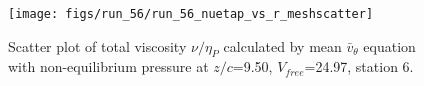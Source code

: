 \begin{figure}[H]
\centering
\texttt{[image: figs/run\_56/run\_56\_nuetap\_vs\_r\_meshscatter]}
\caption{Scatter plot of total viscosity $\nu / \eta_P$ calculated by mean $\bar{v}_{\theta}$ equation with non-equilibrium pressure at $z/c$=9.50, $V_{free}$=24.97, station 6.}
\label{fig:run_56_nuetap_vs_r_meshscatter}
\end{figure}


